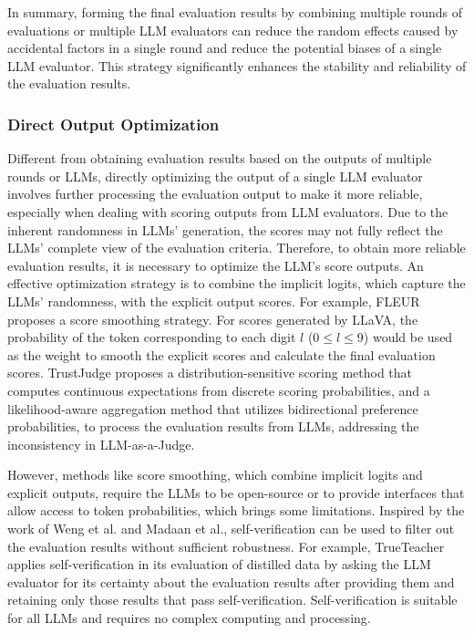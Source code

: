 In summary, forming the final evaluation results by combining multiple rounds of evaluations or multiple LLM evaluators can reduce the random effects caused by accidental factors in a single round and reduce the potential biases of a single LLM evaluator. This strategy significantly enhances the stability and reliability of the evaluation results.



\subsubsection{\textbf{Direct Output Optimization}}
\label{subsubsec:process_outputs}

Different from obtaining evaluation results based on the outputs of multiple rounds or LLMs, directly optimizing the output of a single LLM evaluator involves further processing the evaluation output to make it more reliable, especially when dealing with scoring outputs from LLM evaluators. 
Due to the inherent randomness in LLMs' generation, the scores may not fully reflect the LLMs' complete view of the evaluation criteria. 
Therefore, to obtain more reliable evaluation results, it is necessary to optimize the LLM's score outputs. 
An effective optimization strategy is to combine the implicit logits, which capture the LLMs' randomness, with the explicit output scores. 
For example, FLEUR\cite{lee-etal-2024-fleur} proposes a score smoothing strategy. For scores generated by LLaVA, the probability of the token corresponding to each digit $l$ (0$\leq l\leq$9) would be used as the weight to smooth the explicit scores and calculate the final evaluation scores.
TrustJudge\cite{wang2025trustjudge} proposes a distribution-sensitive scoring method that computes continuous expectations from discrete scoring probabilities, and a likelihood-aware aggregation method that utilizes bidirectional preference probabilities, to process the evaluation results from LLMs, addressing the inconsistency in LLM-as-a-Judge.

However, methods like score smoothing, which combine implicit logits and explicit outputs, require the LLMs to be open-source or to provide interfaces that allow access to token probabilities, which brings some limitations. Inspired by the work of Weng et al.\cite{weng-etal-2023-large} and Madaan et al.\cite{madaan2024self}, self-verification can be used to filter out the evaluation results without sufficient robustness. For example, TrueTeacher\cite{gekhman2023trueteacher} applies self-verification in its evaluation of distilled data by asking the LLM evaluator for its certainty about the evaluation results after providing them and retaining only those results that pass self-verification. Self-verification is suitable for all LLMs and requires no complex computing and processing.

